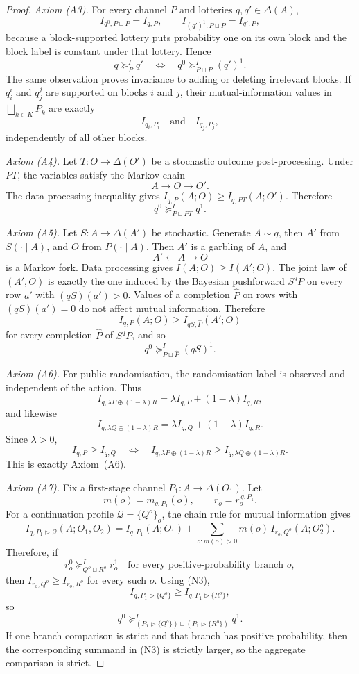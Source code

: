\documentclass[11pt,a4paper]{article}
\theoremstyle{definition}
\newcommand{\1}{\mathbf 1}
\begin{document}
\begin{proof}
\emph{Axiom \textup{(A3)}.}
For every channel $P$ and lotteries $q,q'\in\Delta(A)$,
\[
I_{q^0,P\sqcup P}=I_{q,P},
\qquad
I_{(q')^1,P\sqcup P}=I_{q',P},
\]
because a block-supported lottery puts probability one on its own block and the block label is constant under that
lottery.  Hence
\[
q\succeq^I_P q'
\quad\Longleftrightarrow\quad
q^0\succeq^I_{P\sqcup P}(q')^1.
\]
The same observation proves invariance to adding or deleting irrelevant blocks.  If $q_i^i$ and $q_j^j$ are supported on
blocks $i$ and $j$, their mutual-information values in $\bigsqcup_{k\in K}P_k$ are exactly
\[
I_{q_i,P_i}
\quad\text{and}\quad
I_{q_j,P_j},
\]
independently of all other blocks.

\emph{Axiom \textup{(A4)}.}
Let $T:O\to\Delta(O')$ be a stochastic outcome post-processing.  Under $PT$, the variables satisfy the Markov chain
\[
A\longrightarrow O\longrightarrow O'.
\]
The data-processing inequality gives $I_{q,P}(A;O)\ge I_{q,PT}(A;O')$.  Therefore
\[
q^0\succeq^I_{P\sqcup PT}q^1.
\]

\emph{Axiom \textup{(A5)}.}
Let $S:A\to\Delta(A')$ be stochastic.  Generate $A\sim q$, then $A'$ from $S(\cdot\mid A)$, and $O$ from
$P(\cdot\mid A)$.  Then $A'$ is a garbling of $A$, and
\[
A'\longleftarrow A\longrightarrow O
\]
is a Markov fork.  Data processing gives $I(A;O)\ge I(A';O)$.  The joint law of $(A',O)$ is exactly the one induced by the
Bayesian pushforward $S^qP$ on every row $a'$ with $(qS)(a')>0$.  Values of a completion $\widehat P$ on rows with
$(qS)(a')=0$ do not affect mutual information.  Therefore
\[
I_{q,P}(A;O)\ge I_{qS,\widehat P}(A';O)
\]
for every completion $\widehat P$ of $S^qP$, and so
\[
q^0\succeq^I_{P\sqcup\widehat P}(qS)^1.
\]

\emph{Axiom \textup{(A6)}.}
For public randomisation, the randomisation label is observed and independent of the action.  Thus
\[
I_{q,\lambda P\oplus(1-\lambda)R}
=
\lambda I_{q,P}+(1-\lambda)I_{q,R},
\]
and likewise
\[
I_{q,\lambda Q\oplus(1-\lambda)R}
=
\lambda I_{q,Q}+(1-\lambda)I_{q,R}.
\]
Since $\lambda>0$,
\[
I_{q,P}\ge I_{q,Q}
\quad\Longleftrightarrow\quad
I_{q,\lambda P\oplus(1-\lambda)R}
\ge
I_{q,\lambda Q\oplus(1-\lambda)R}.
\]
This is exactly Axiom~\textup{(A6)}.

\emph{Axiom \textup{(A7)}.}
Fix a first-stage channel $P_1:A\to\Delta(O_1)$.  Let
\[
m(o)=m_{q,P_1}(o),
\qquad
r_o=r_o^{\,q,P_1}.
\]
For a continuation profile $\mathcal Q=\{Q^o\}_o$, the chain rule for mutual information gives
\[
I_{q,P_1\triangleright\mathcal Q}(A;O_1,O_2)
=
I_{q,P_1}(A;O_1)
+
\sum_{o:m(o)>0}m(o)\,I_{r_o,Q^o}(A;O_2^o).
\tag{N3}
\]
Therefore, if
\[
r_o^0\succeq^I_{Q^o\sqcup R^o}r_o^1
\quad\text{for every positive-probability branch }o,
\]
then $I_{r_o,Q^o}\ge I_{r_o,R^o}$ for every such $o$.  Using (N3),
\[
I_{q,P_1\triangleright\{Q^o\}}
\ge
I_{q,P_1\triangleright\{R^o\}},
\]
so
\[
q^0
\succeq^I_{(P_1\triangleright\{Q^o\})\sqcup(P_1\triangleright\{R^o\})}
q^1.
\]
If one branch comparison is strict and that branch has positive probability, then the corresponding summand in (N3) is
strictly larger, so the aggregate comparison is strict.


\end{proof}
\end{document}
